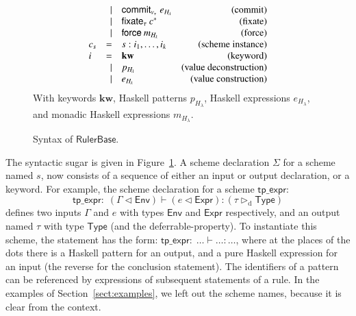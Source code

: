 \documentclass[preprint,natbib]{sigplanconf}
\newcommand\Statement{c}
\newcommand\Statements{\Statement^*}
\newcommand\Scheme{\Sigma}
\newcommand\SchemeName{s}
\newcommand\Type{\tau}
\newcommand\Idents[1]{{#1}^{\!*}}
\newcommand\Haskell{H_{\!\lambda}}
\newcommand\Fixate{\mathsf{fixate}}
\newcommand\Commit{\mathsf{commit}}
\newcommand\Onebyone{\mathsf{onebyone}}
\newcommand\Force{\mathsf{force}}
\newcommand\typeofinput{\lhd}
\newcommand\typeofoutput{\rhd}
\newcommand\RulerBase{\ensuremath{\mathsf{Ruler Base}}}
\begin{document}
\begin{figure}[htp]
\begin{displaymath}
\begin{array}[t]{lrlr}
                                   &    \mid &   \Commit_{v_{\Type}} \; e_{\Haskell}                                   & (\mbox{commit})\\
                                   &    \mid &   \Fixate_{\Type} \: \Statements                                        & (\mbox{fixate})\\
                                   &    \mid &   \Force \: m_{\Haskell}                                                & (\mbox{force})\\
        \Statement_\SchemeName     &    =    &   \SchemeName : i_1, \ldots, i_k                                        & (\mbox{scheme instance})\\
        i                          &    =    &   \mathbf{kw}                                                           & (\mbox{keyword})\\
                                   &    \mid &    p_{\Haskell}                                                         & (\mbox{value deconstruction})\\
                                   &    \mid &    e_{\Haskell}                                                         & (\mbox{value construction}) \\
      \end{array}
    \end{displaymath}
    With keywords $\mathbf{kw}$, Haskell patterns $p_{\Haskell}$, Haskell expressions $e_{\Haskell}$, and monadic Haskell expressions $m_{\Haskell}$.
    \caption{Syntax of \RulerBase.}
    \label{fig:ruler-base-syntax}
    \end{figure}
    
    The syntactic sugar is given in Figure~\ref{fig:ruler-base-syntax}. A scheme declaration $\Scheme$ for a
    scheme named $\SchemeName$, now consists of a sequence of either an input or output declaration, or a keyword.
    For example, the scheme declaration for a scheme $\mathsf{tp\_expr}$:
    \begin{displaymath}
      \mathsf{tp\_expr: } \; (\Gamma \typeofinput \mathsf{Env}) \vdash (e \typeofinput \mathsf{Expr}) : (\tau \typeofoutput_{\mbox{d}} \mathsf{Type})
    \end{displaymath}
    defines two inputs $\Gamma$ and $e$ with types $\mathsf{Env}$ and $\mathsf{Expr}$ respectively, and an
    output named $\tau$ with type $\mathsf{Type}$ (and the deferrable-property). To instantiate this scheme, the statement has the form:
    $\mathsf{tp\_expr: } \; \ldots \vdash \ldots : \ldots$, where at the places of the dots there is a
    Haskell pattern for an output, and a pure Haskell expression for an input (the reverse for the conclusion
    statement). The identifiers of a pattern can be referenced by expressions of subsequent statements of a rule. In the examples of
    Section~\ref{sect:examples}, we left out the scheme names, because it is clear from the context.
\end{document}
